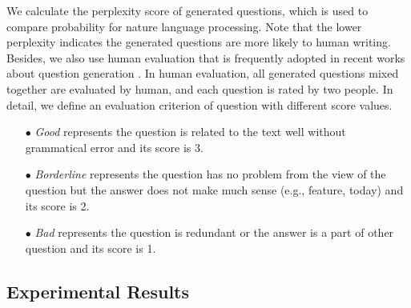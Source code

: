 \documentclass[runningheads,UTF8,article]{comsis2}
\begin{document}
	We calculate the perplexity \cite{Popel} score of generated questions, which is used to compare probability for nature language processing. Note that the lower perplexity indicates the generated questions are more likely to human writing.
	Besides, we also use human evaluation that is frequently adopted in recent works about question generation \cite{DBLP:journals/corr/DuSC17,Susanti2017,lindberg2013generating}. In human evaluation, all generated questions mixed together are evaluated by human, and each question is rated by two people. In detail, we define an evaluation criterion of question with different score values.
	\begin{itemize}
		\item[$\bullet$]{\emph{Good} represents the question is related to the text well without grammatical error and its score is 3.}
		\item[$\bullet$]{\emph{Borderline} represents the question has no problem from the view of the question but the answer does not make much sense (e.g., feature, today) and its score is 2.}
		\item[$\bullet$]{\emph{Bad} represents the question is redundant or the answer is a part of other question and its score is 1.}
	\end{itemize}
	
	
	
	\subsection{Experimental Results}
	
\end{document}
